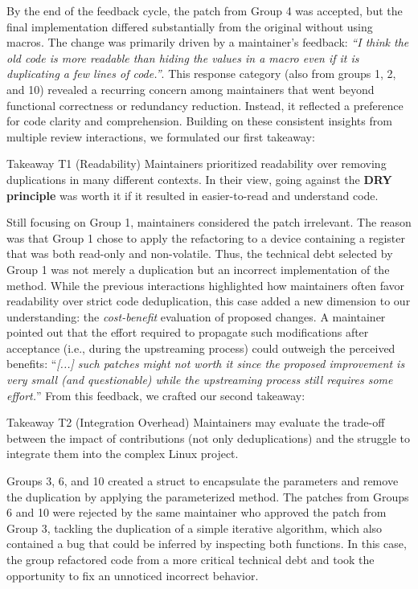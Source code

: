 \documentclass[10pt,conference]{IEEEtran}
\newenvironment{highlight-box}[1]{%
  \begin{tcolorbox}
  \textbf{#1:} \itshape}{\end{tcolorbox}}
\begin{document}
By the end of the feedback cycle, the patch from Group 4 was accepted, but the final implementation differed substantially from the original without using macros. The change was primarily driven by a maintainer's feedback: \textit{``I think the old code is more readable than hiding the values in a macro even if it is duplicating a few lines of code.''}.
%
This response category (also from groups 1, 2, and 10) revealed a recurring concern among maintainers that went beyond functional correctness or redundancy reduction. Instead, it reflected a preference for code clarity and comprehension. Building on these consistent insights from multiple review interactions, we formulated our first takeaway:
\begin{highlight-box}{Takeaway T1 (Readability)}
Maintainers prioritized readability over removing duplications in many different contexts. In their view, going against the \textbf{DRY principle} was worth it if it resulted in easier-to-read and understand code.
\end{highlight-box}

Still focusing on Group 1, maintainers considered the patch irrelevant. The reason was that Group 1 chose to apply the refactoring to a device containing a register that was both read-only and non-volatile. Thus, the technical debt selected by Group 1 was not merely a duplication but an incorrect implementation of the method.
%
While the previous interactions highlighted how maintainers often favor readability over strict code deduplication, this case added a new dimension to our understanding: the \textit{cost-benefit} evaluation of proposed changes. A maintainer pointed out that the effort required to propagate such modifications after acceptance (i.e., during the upstreaming process) could outweigh the perceived benefits: ``\textit{[...] such patches might not worth it since the proposed improvement is very small (and questionable) while the upstreaming process still requires some effort.}''
From this feedback, we crafted our second takeaway:
\begin{highlight-box}{Takeaway T2 (Integration Overhead)}
Maintainers may evaluate the trade-off between the impact of contributions
(not only deduplications) and the struggle to integrate them into the complex
Linux project.
\end{highlight-box}

Groups 3, 6, and 10 created a struct to encapsulate the parameters and remove the duplication by applying the parameterized method. The patches from Groups 6 and 10 were rejected by the same maintainer who approved the patch from Group 3, tackling the duplication of a simple iterative algorithm, which also contained a bug that could be inferred by inspecting both functions. In this case, the group refactored code from a more critical technical debt and took the opportunity to fix an unnoticed incorrect behavior.
\end{document}
